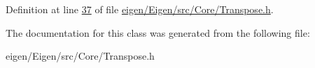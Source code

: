 Definition at line \hyperlink{eigen_2_eigen_2src_2_core_2_transpose_8h_source_l00037}{37} of file \hyperlink{eigen_2_eigen_2src_2_core_2_transpose_8h_source}{eigen/\+Eigen/src/\+Core/\+Transpose.\+h}.



The documentation for this class was generated from the following file\+:\begin{DoxyCompactItemize}
\item 
eigen/\+Eigen/src/\+Core/\+Transpose.\+h\end{DoxyCompactItemize}
